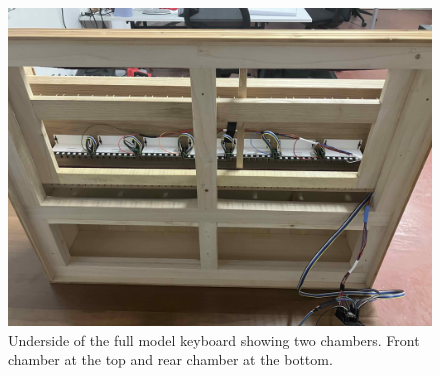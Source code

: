 
\begin{figure}  
  \centering
  \includegraphics[width=\linewidth]{src/images/49-key-bottom-sensors-no-keys.jpg} 
  \caption{Underside of the full model keyboard showing two chambers. Front chamber at the top and rear chamber at the bottom.} 
  \Description{} 
  \label{fig:49-key-bottom}
\end{figure}









